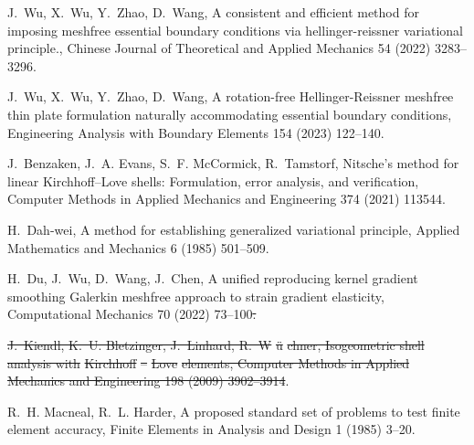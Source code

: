 \documentclass{elsarticle}
\providecommand{\DIFdeltex}[1]{{\protect\color{red}\sout{#1}}}                      %
\providecommand{\DIFdelbegin}{} %
\providecommand{\DIFdelend}{} %
\providecommand{\DIFdel}[1]{\texorpdfstring{\DIFdeltex{#1}}{}} %
\newcommand{\DIFscaledelfig}{0.5}
\newlength{\DIFdelgraphicswidth} %
\newlength{\DIFdelgraphicsheight} %
\newcommand{\DIFdelincludegraphics}[2][]{%
\sbox{\DIFdelgraphicsbox}{\DIFOincludegraphics[#1]{#2}}%
\settoboxwidth{\DIFdelgraphicswidth}{\DIFdelgraphicsbox} %
\settoboxtotalheight{\DIFdelgraphicsheight}{\DIFdelgraphicsbox} %
\scalebox{\DIFscaledelfig}{%
\parbox[b]{\DIFdelgraphicswidth}{\usebox{\DIFdelgraphicsbox}\\[-\baselineskip] \rule{\DIFdelgraphicswidth}{0em}}\llap{\resizebox{\DIFdelgraphicswidth}{\DIFdelgraphicsheight}{%
\setlength{\unitlength}{\DIFdelgraphicswidth}%
\begin{picture}(1,1)%
\thicklines\linethickness{2pt} %
{\color[rgb]{1,0,0}\put(0,0){\framebox(1,1){}}}%
{\color[rgb]{1,0,0}\put(0,0){\line( 1,1){1}}}%
{\color[rgb]{1,0,0}\put(0,1){\line(1,-1){1}}}%
\end{picture}%
}\hspace*{3pt}}} %
} %
\DeclareRobustCommand{\DIFdelbegin}{\DIFOdelbegin \let\includegraphics\DIFdelincludegraphics} %
\DeclareRobustCommand{\DIFdelend}{\DIFOaddend \let\includegraphics\DIFOincludegraphics} %
\begin{document}
\begin{thebibliography}{10}
J.~Wu, X.~Wu, Y.~Zhao, D.~Wang, A consistent and efficient method for imposing meshfree essential boundary conditions via hellinger-reissner variational principle., Chinese Journal of Theoretical and Applied Mechanics 54 (2022) 3283--3296.

J.~Wu, X.~Wu, Y.~Zhao, D.~Wang, A rotation-free {{Hellinger-Reissner}} meshfree thin plate formulation naturally accommodating essential boundary conditions, Engineering Analysis with Boundary Elements 154 (2023) 122--140.

J.~Benzaken, J.~A. Evans, S.~F. McCormick, R.~Tamstorf, Nitsche's method for linear {{Kirchhoff}}--{{Love}} shells: {{Formulation}}, error analysis, and verification, Computer Methods in Applied Mechanics and Engineering 374 (2021) 113544.

H.~{Dah-wei}, A method for establishing generalized variational principle, Applied Mathematics and Mechanics 6 (1985) 501--509.

H.~Du, J.~Wu, D.~Wang, J.~Chen, A unified reproducing kernel gradient smoothing {{Galerkin}} meshfree approach to strain gradient elasticity, Computational Mechanics 70 (2022) 73--100\DIFdelbegin \DIFdel{.
}%

\DIFdel{J.~Kiendl, K.~U. Bletzinger, J.~Linhard, R.~W}%
\DIFdel{\"u}%
\DIFdel{chner, Isogeometric shell analysis with }%
\DIFdel{Kirchhoff}%
\DIFdel{--}%
\DIFdel{Love}%
\DIFdel{elements, Computer Methods in Applied Mechanics and Engineering 198 (2009) 3902--3914}\DIFdelend .

R.~H. Macneal, R.~L. Harder, A proposed standard set of problems to test finite element accuracy, Finite Elements in Analysis and Design 1 (1985) 3--20.

\end{thebibliography}
\end{document}
